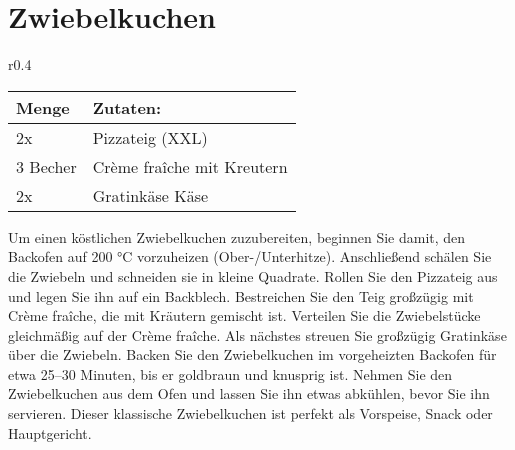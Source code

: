\section{Zwiebelkuchen}
\begin{wraptable}{r}{0.4\textwidth}
    \centering
    \begin{tabularx}{0.39\textwidth}{|l|X|}
        \toprule
        Menge & Zutaten: \\
        \midrule
        2x & Pizzateig (XXL) \\
        \midrule
        3 Becher & Crème fraîche mit Kreutern \\
        \midrule
        2x & Gratinkäse Käse\\
        \bottomrule
    \end{tabularx}
\end{wraptable}
Um einen köstlichen Zwiebelkuchen zuzubereiten, beginnen Sie damit, den Backofen auf 200 °C vorzuheizen (Ober-/Unterhitze). 
Anschließend schälen Sie die Zwiebeln und schneiden sie in kleine Quadrate. 
Rollen Sie den Pizzateig aus und legen Sie ihn auf ein Backblech. 
Bestreichen Sie den Teig großzügig mit Crème fraîche, die mit Kräutern gemischt ist. 
Verteilen Sie die Zwiebelstücke gleichmäßig auf der Crème fraîche. 
Als nächstes streuen Sie großzügig Gratinkäse über die Zwiebeln. 
Backen Sie den Zwiebelkuchen im vorgeheizten Backofen für etwa 25–30 Minuten, bis er goldbraun und knusprig ist. 
Nehmen Sie den Zwiebelkuchen aus dem Ofen und lassen Sie ihn etwas abkühlen, bevor Sie ihn servieren. 
Dieser klassische Zwiebelkuchen ist perfekt als Vorspeise, Snack oder Hauptgericht.
\newpage
